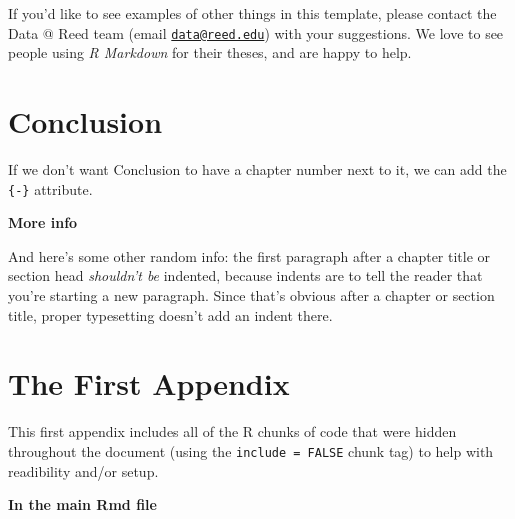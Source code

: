 \documentclass[12pt,twoside]{reedthesis}
\theoremstyle{definition}
\theoremstyle{definition}
\theoremstyle{definition}
\theoremstyle{remark}
\begin{document}
If you'd like to see examples of other things in this template, please
contact the Data @ Reed team (email
\href{mailto:data@reed.edu}{\nolinkurl{data@reed.edu}}) with your
suggestions. We love to see people using \emph{R Markdown} for their
theses, and are happy to help.

\chapter*{Conclusion}\label{conclusion}

If we don't want Conclusion to have a chapter number next to it, we can
add the \texttt{\{-\}} attribute.

\textbf{More info}

And here's some other random info: the first paragraph after a chapter
title or section head \emph{shouldn't be} indented, because indents are
to tell the reader that you're starting a new paragraph. Since that's
obvious after a chapter or section title, proper typesetting doesn't add
an indent there.

\appendix

\chapter{The First Appendix}\label{the-first-appendix}

This first appendix includes all of the R chunks of code that were
hidden throughout the document (using the \texttt{include\ =\ FALSE}
chunk tag) to help with readibility and/or setup.

\textbf{In the main Rmd file}
\end{document}
